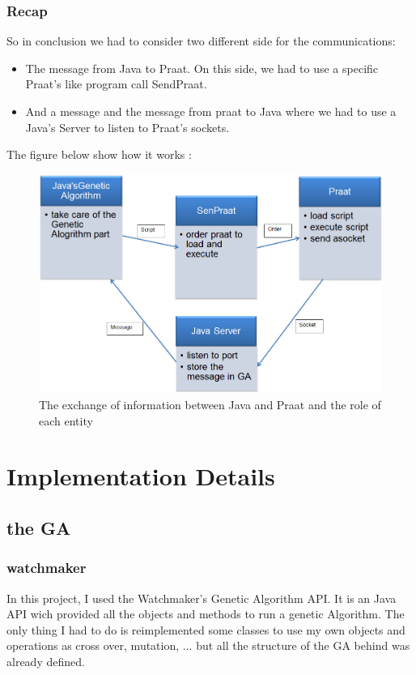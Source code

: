 \documentclass[12pt]{report}
\begin{document}
\section{Recap}
So in conclusion we had to consider two different side for the communications:
\begin{itemize}
\item The message from Java to Praat. On this side, we had to use a specific Praat's like program call SendPraat.
\item And a message and the message from praat to Java where we had to use a Java's Server to listen to Praat's sockets.
\end{itemize}


The figure below show how it works :
\begin{figure}
\begin{center}
\includegraphics[scale=0.6]{resources/architecture.png} 
\end{center}
\caption{The exchange of information between Java and Praat and the role of each entity}
\label{architecture}
\end{figure}

\part{Implementation Details}
\chapter{the GA}
\section{watchmaker}
In this project, I used the Watchmaker's Genetic Algorithm API\cite{ref}. It is an Java API wich provided all the objects and methods to run a genetic Algorithm. The only thing I had to do is reimplemented some classes to use my own objects and operations as cross over, mutation, ... but all the structure of the GA behind was already defined.
\end{document}
